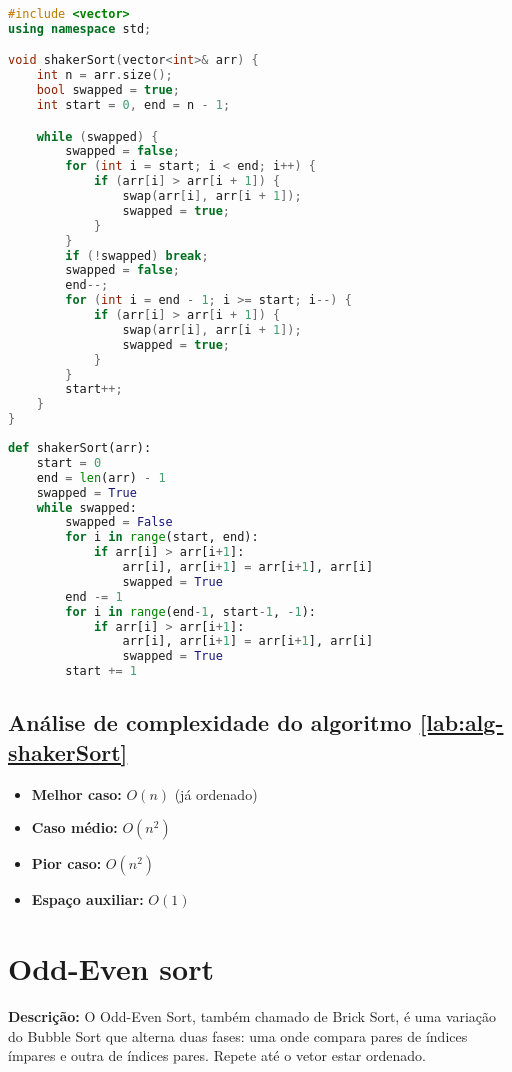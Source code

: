 \begin{lstlisting}[language=C++,caption={Shaker sort em C++},captionpos=t]
#include <vector>
using namespace std;

void shakerSort(vector<int>& arr) {
    int n = arr.size();
    bool swapped = true;
    int start = 0, end = n - 1;

    while (swapped) {
        swapped = false;
        for (int i = start; i < end; i++) {
            if (arr[i] > arr[i + 1]) {
                swap(arr[i], arr[i + 1]);
                swapped = true;
            }
        }
        if (!swapped) break;
        swapped = false;
        end--;
        for (int i = end - 1; i >= start; i--) {
            if (arr[i] > arr[i + 1]) {
                swap(arr[i], arr[i + 1]);
                swapped = true;
            }
        }
        start++;
    }
}
\end{lstlisting}

\begin{lstlisting}[language=python,caption={Shaker sort em Python},captionpos=t]
def shakerSort(arr):
    start = 0
    end = len(arr) - 1
    swapped = True
    while swapped:
        swapped = False
        for i in range(start, end):
            if arr[i] > arr[i+1]:
                arr[i], arr[i+1] = arr[i+1], arr[i]
                swapped = True
        end -= 1
        for i in range(end-1, start-1, -1):
            if arr[i] > arr[i+1]:
                arr[i], arr[i+1] = arr[i+1], arr[i]
                swapped = True
        start += 1
\end{lstlisting}

\subsection{Análise de complexidade do algoritmo \ref{lab:alg-shakerSort}}
\begin{itemize}
    \item \textbf{Melhor caso:} $O(n)$ (já ordenado)
    \item \textbf{Caso médio:} $O(n^2)$
    \item \textbf{Pior caso:} $O(n^2)$
    \item \textbf{Espaço auxiliar:} $O(1)$
\end{itemize}


\section{Odd-Even sort}
\textbf{Descrição:} O Odd-Even Sort, também chamado de Brick Sort, é uma variação do Bubble Sort que alterna duas fases: uma onde compara pares de índices ímpares e outra de índices pares. Repete até o vetor estar ordenado.

